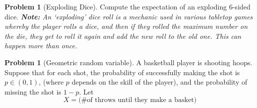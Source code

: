 \documentclass[10pt]{article}
\theoremstyle{definition}
\newtheorem{problem}[theorem]{Problem}
\newcommand{\1}[1]{\textbf{1}_{\left[#1\right]}} %
\begin{document}
\begin{problem}[Exploding Dice]
  Compute the expectation of an exploding 6-sided dice.
  \textit{\textbf{Note: }An `exploding' dice roll is a mechanic used in various tabletop games whereby the player rolls a dice,
  and then if they rolled the maximum number on the die, they get to roll it again and add the new roll to
  the old one. This can happen more than once.} 
\end{problem}




\begin{problem}[Geometric random variable]
  A basketball player is shooting hoops. Suppose that for each shot, the
  probability of successfully making the shot is $p\in (0,1)$, (where $p$
  depends on the skill of the player), and the probability of missing the shot
  is $1-p$. Let
  \begin{equation*}
    X = \text{(\# of throws until they make a basket)}
  \end{equation*}
 

\end{problem}
\end{document}
